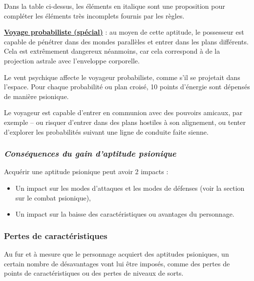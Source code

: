 \bigskip

Dans la table ci-dessus, les éléments en italique sont une proposition pour compléter les éléments très incomplets fournis par les règles.

\bigskip

\textbf{\uline{Voyage probabiliste (spécial)}} : au moyen de cette aptitude, le possesseur est capable de pénétrer dans des mondes parallèles et entrer dans les plans différents. Cela est extrêmement dangereux néanmoins, car cela correspond à de la projection astrale avec l'enveloppe corporelle.

\bigskip

Le vent psychique affecte le voyageur probabiliste, comme s'il se projetait dans l'espace. Pour chaque probabilité ou plan croisé, 10 points d'énergie sont dépensés de manière psionique.

\bigskip

Le voyageur est capable d'entrer en communion avec des pouvoirs amicaux, par exemple -- ou risquer d'entrer dans des plans hostiles à son alignement, ou tenter d'explorer les probabilités suivant une ligne de conduite faite sienne.

\newpage
\subsubsection*{\textit{Conséquences du gain d'aptitude psionique}}

Acquérir une aptitude psionique peut avoir 2 impacts :
\begin{itemize}
\item Un impact sur les modes d'attaques et les modes de défenses (voir la section sur le combat psionique),
\item Un impact sur la baisse des caractéristiques ou avantages du personnage.
\end{itemize}

\subsubsection*{Pertes de caractéristiques}

Au fur et à mesure que le personnage acquiert des aptitudes psioniques, un certain nombre de désavantages vont lui être imposés, comme des pertes de points de caractéristiques ou des pertes de niveaux de sorts.

